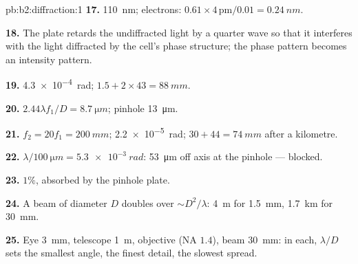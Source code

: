\begin{solution}{pb:b2:diffraction:1}
\textbf{17.} \qty{110}{nm}; electrons: $0.61 \times 4\,\text{pm}/0.01 = \qty{0.24}{nm}$.

\textbf{18.} The plate retards the undiffracted light by a quarter wave
so that it interferes with the light diffracted by the cell's
phase structure; the phase pattern becomes an intensity pattern.

\textbf{19.} \qty{4.3e-4}{rad}; $1.5 + 2 \times 43 = \qty{88}{mm}$.

\textbf{20.} $2.44\lambda f_1/D = \qty{8.7}{\micro m}$; pinhole \qty{13}{\micro m}.

\textbf{21.} $f_2 = 20f_1 = \qty{200}{mm}$; \qty{2.2e-5}{rad}; $30 + 44 = \qty{74}{mm}$ after a
kilometre.

\textbf{22.} $\lambda/\qty{100}{\micro m} = \qty{5.3e-3}{rad}$: \qty{53}{\micro m} off axis at the
pinhole --- blocked.

\textbf{23.} $1\%$, absorbed by the pinhole plate.

\textbf{24.} A beam of diameter $D$ doubles over $\sim D^2/\lambda$: \qty{4}{m} for
\qty{1.5}{mm}, \qty{1.7}{km} for \qty{30}{mm}.

\textbf{25.} Eye \qty{3}{mm}, telescope \qty{1}{m}, objective (NA $1.4$), beam
\qty{30}{mm}: in each, $\lambda/D$ sets the smallest angle, the finest detail, the
slowest spread.
\end{solution}

